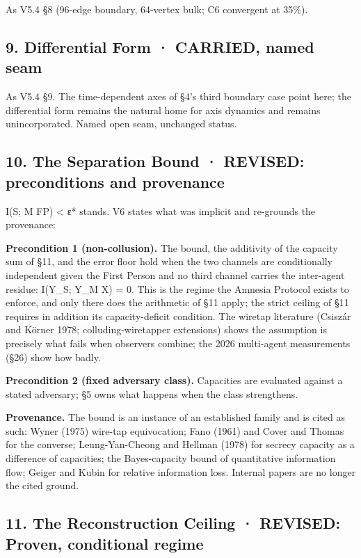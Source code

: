 \documentclass[
  11pt,
]{article}
\begin{document}
As V5.4 §8 (96-edge boundary, 64-vertex bulk; C6 convergent at 35\%).

\subsection{9. Differential Form · CARRIED, named
seam}\label{differential-form-carried-named-seam}

As V5.4 §9. The time-dependent axes of §4's third boundary case point
here; the differential form remains the natural home for axis dynamics
and remains unincorporated. Named open seam, unchanged status.

\subsection{10. The Separation Bound · REVISED: preconditions and
provenance}\label{the-separation-bound-revised-preconditions-and-provenance}

I(S; M \textbar{} FP) \textless{} ε* stands. V6 states what was implicit
and re-grounds the provenance:

\textbf{Precondition 1 (non-collusion).} The bound, the additivity of
the capacity sum of §11, and the error floor hold when the two channels
are conditionally independent given the First Person and no third
channel carries the inter-agent residue: I(Y\_S; Y\_M \textbar{} X) = 0.
This is the regime the Amnesia Protocol exists to enforce, and only
there does the arithmetic of §11 apply; the strict ceiling of §11
requires in addition its capacity-deficit condition. The wiretap
literature (Csiszár and Körner 1978; colluding-wiretapper extensions)
shows the assumption is precisely what fails when observers combine; the
2026 multi-agent measurements (§26) show how badly.

\textbf{Precondition 2 (fixed adversary class).} Capacities are
evaluated against a stated adversary; §5 owns what happens when the
class strengthens.

\textbf{Provenance.} The bound is an instance of an established family
and is cited as such: Wyner (1975) wire-tap equivocation; Fano (1961)
and Cover and Thomas for the converse; Leung-Yan-Cheong and Hellman
(1978) for secrecy capacity as a difference of capacities; the
Bayes-capacity bound of quantitative information flow; Geiger and Kubin
for relative information loss. Internal papers are no longer the cited
ground.

\subsection{11. The Reconstruction Ceiling · REVISED: Proven,
conditional
regime}\label{the-reconstruction-ceiling-revised-proven-conditional-regime}
\end{document}
